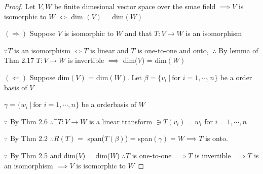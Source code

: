 \begin{proof}
	Let $V,W$ be finite dimesional vector space over the smae field $\implies V$ is isomorphic to $W$ $\Leftrightarrow$ dim $(V)$ = dim$(W)$
	
	$(\Rightarrow)$ Suppose $V$ is isomorphic to $W$ and that $T:V \rightarrow W$ is an isomorphism
	
	$\because T$ is an isomorphism $\Leftrightarrow T$ is linear and $T$ is one-to-one and onto, $~\therefore$ By lemma of Thm 2.17 $T:V \rightarrow W$ is invertible $\implies$ dim($V$) = dim$(W)$
	
	$(\Leftarrow)$ Suppose dim$(V)$ = dim$(W)$. Let $\beta = \{v_i ~|~ \text{for } i = 1,\cdots,n\}$ be a order basis of $V$
	
	$\gamma = \{w_i ~|~ \text{for } i = 1,\cdots,n\}$ be a orderbasis of $W$
	
	$\because $ By Thm 2.6 $\therefore \exists T: V \rightarrow W$ is a linear transform $\ni T(v_i) = w_i$ for $i = 1 ,\cdots,n$
	
	$\because$ By Thm 2.2 $\therefore R(T) =$ span($T(\beta)$) = span$(\gamma) = W \implies T$ is onto.
	
	$\because$ By Thm 2.5 and dim($V$) = dim($W$) $\therefore T$ is one-to-one $\implies T$ is invertible $\implies T$ is an isomorphism $\implies V$ is isomorphic to $W$
\end{proof}
